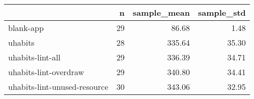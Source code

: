 \begin{tabular}{lrrr}
\toprule
{} &   n &  sample\_mean &  sample\_std \\
\midrule
blank-app                    &  29 &        86.68 &        1.48 \\
uhabits                      &  28 &       335.64 &       35.30 \\
uhabits-lint-all             &  29 &       336.39 &       34.71 \\
uhabits-lint-overdraw        &  29 &       340.80 &       34.41 \\
uhabits-lint-unused-resource &  30 &       343.06 &       32.95 \\
\bottomrule
\end{tabular}
